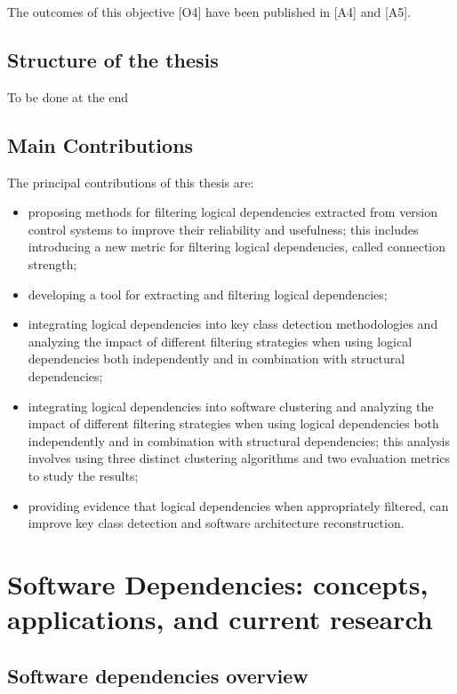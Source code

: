 The outcomes of this objective [O4] have been published in [A4] and [A5].

\section{Structure of the thesis}
To be done at the end

\section{Main Contributions}

\hspace{4em}The principal contributions of this thesis are:  
\begin{itemize}  
    \item proposing methods for filtering logical dependencies extracted from version control systems to improve their reliability and usefulness; this includes introducing a new metric for filtering logical dependencies, called connection strength;  
    \item developing a tool for extracting and filtering logical dependencies;  
    \item integrating logical dependencies into key class detection methodologies and analyzing the impact of different filtering strategies when using logical dependencies both independently and in combination with structural dependencies;  
    \item integrating logical dependencies into software clustering and analyzing the impact of different filtering strategies when using logical dependencies both independently and in combination with structural dependencies; this analysis involves using three distinct clustering algorithms and two evaluation metrics to study the results;  
    \item providing evidence that logical dependencies when appropriately filtered, can improve key class detection and software architecture reconstruction.  
\end{itemize}  


\chapter{Software Dependencies: concepts, applications, and current research}
\label{dep}

\section{Software dependencies overview}

